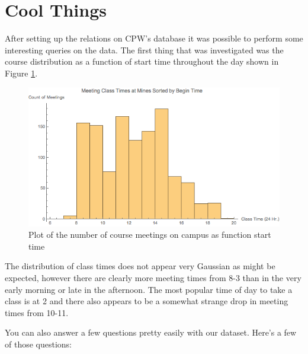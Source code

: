 \documentclass[12pt,letterpaper,titlepage]{article}
\begin{document}
\section{Cool Things}
After setting up the relations on CPW's database it was possible to perform some interesting queries on the data. The first thing that was investigated was the course distribution as a function of start time throughout the day shown in Figure \ref{fig:starthours}.

\begin{figure}[H]
\centering
\includegraphics[width = 4 in]{classmeetinghist.png}
\caption{\label{fig:starthours}Plot of the number of course meetings on campus as function start time}
\end{figure}

The distribution of class times does not appear very Gaussian as might be expected, however there are clearly more meeting times from 8-3 than in the very early morning or late in the afternoon. The most popular time of day to take a class is at 2 and there also appears to be a somewhat strange drop in meeting times from 10-11. 

You can also answer a few questions pretty easily with our dataset. Here's a
few of those questions:
\end{document}
